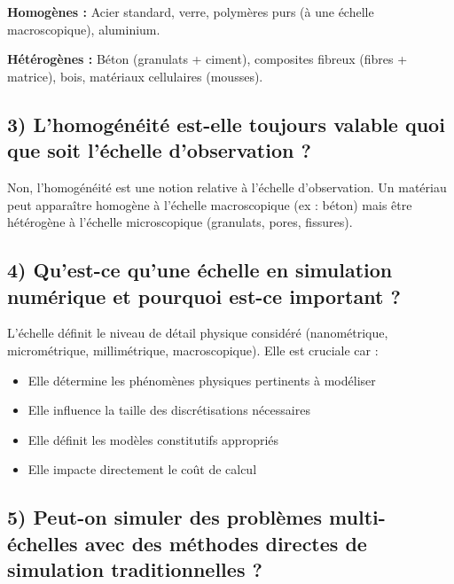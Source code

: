 \documentclass{rapportECL}
\begin{document}
\begin{tcolorbox}[colback=white!5!white,colframe=blue!75!black]
\textbf{Homogènes :} Acier standard, verre, polymères purs (à une échelle macroscopique), aluminium.

\textbf{Hétérogènes :} Béton (granulats + ciment), composites fibreux (fibres + matrice), bois, matériaux cellulaires (mousses).
\end{tcolorbox}

\subsection*{3) L'homogénéité est-elle toujours valable quoi que soit l'échelle d'observation ?}

\begin{tcolorbox}[colback=white!5!white,colframe=blue!75!black]
Non, l'homogénéité est une notion relative à l'échelle d'observation. Un matériau peut apparaître homogène à l'échelle macroscopique (ex : béton) mais être hétérogène à l'échelle microscopique (granulats, pores, fissures).
\end{tcolorbox}

\subsection*{4) Qu'est-ce qu'une échelle en simulation numérique et pourquoi est-ce important ?}

\begin{tcolorbox}[colback=white!5!white,colframe=blue!75!black]
L'échelle définit le niveau de détail physique considéré (nanométrique, micrométrique, millimétrique, macroscopique). Elle est cruciale car :
\begin{itemize}[noitemsep]
\item Elle détermine les phénomènes physiques pertinents à modéliser
\item Elle influence la taille des discrétisations nécessaires
\item Elle définit les modèles constitutifs appropriés
\item Elle impacte directement le coût de calcul
\end{itemize}
\end{tcolorbox}

\subsection*{5) Peut-on simuler des problèmes multi-échelles avec des méthodes directes de simulation traditionnelles ?}
\end{document}
